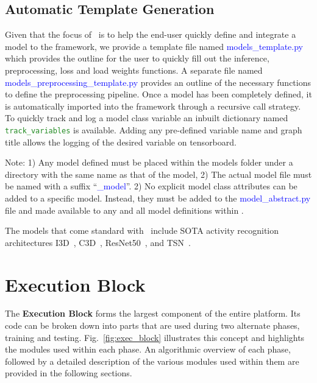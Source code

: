 \documentclass{llncs}
\begin{document}
\subsection{Automatic Template Generation}
Given that the focus of \acro~is to help the end-user quickly define and integrate a model to the framework, we provide a template file named \textcolor{blue}{models\_template.py} which provides the outline for the user to quickly fill out the inference, preprocessing, loss and load weights functions.
A separate file named \textcolor{blue}{models\_preprocessing\_template.py} provides an outline of the necessary functions to define the preprocessing pipeline.
Once a model has been completely defined, it is automatically imported into the framework through a recursive call strategy.
To quickly track and log a model class variable an inbuilt dictionary named \texttt{\textcolor{ForestGreen}{track\_variables}} is available.
Adding any pre-defined variable name and graph title allows the logging of the desired variable on tensorboard.

Note: 1) Any model defined must be placed within the models folder under a directory with the same name as that of the model,
2) The actual model file must be named with a suffix ``\textcolor{blue}{\_model}''.
2) No explicit model class attributes can be added to a specific model. Instead, they must be added to the \textcolor{blue}{model\_abstract.py} file and made available to any and all model definitions within \acro.

The models that come standard with \acro~include SOTA activity recognition architectures I3D~\cite{carreira2017quo}, C3D~\cite{6165309}, ResNet50~\cite{He2015}, and TSN~\cite{wang2016temporal}.




\section{Execution Block}
\label{sec:execblock}
The \textbf{Execution Block} forms the largest component of the entire platform. 
Its code can be broken down into parts that are used during two alternate phases, training and testing.
Fig.~\ref{fig:exec_block} illustrates this concept and highlights the modules used within each phase.
An algorithmic overview of each phase, followed by a detailed description of the various modules used within them are provided in the following sections.
\end{document}
